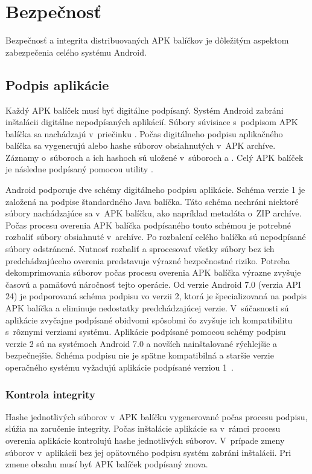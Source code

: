 \section{Bezpečnosť}

Bezpečnosť a integrita distribuovaných APK balíčkov je dôležitým aspektom zabezpečenia celého systému Android.

\subsection{Podpis aplikácie}

Každý APK balíček musí byť digitálne podpísaný. Systém Android zabráni inštalácii digitálne nepodpísaných aplikácií. 
Súbory súvisiace s~podpisom APK balíčka sa nachádzajú v~priečinku . Počas digitálneho podpisu aplikačného balíčka sa vygenerujú  alebo  hashe súborov obsiahnutých v~APK archíve. Záznamy o~súboroch a ich hashoch sú uložené v~súboroch  a . Celý APK balíček je následne podpísaný pomocou utility . 

Android podporuje dve schémy digitálneho podpisu aplikácie. Schéma verzie 1 je založená na podpise štandardného Java balíčka. Táto schéma nechráni niektoré súbory nachádzajúce sa v~APK balíčku, ako napríklad metadáta o~ZIP archíve. Počas procesu overenia APK balíčka podpísaného touto schémou je potrebné rozbaliť súbory obsiahnuté v~archíve. Po rozbalení celého balíčka sú nepodpísané súbory odstránené. Nutnosť rozbaliť a sprocesovať všetky súbory bez ich predchádzajúceho overenia predstavuje výrazné bezpečnostné riziko. Potreba dekomprimovania súborov počas procesu overenia APK balíčka výrazne zvyšuje časovú a pamäťovú náročnosť tejto operácie.  Od verzie Android 7.0 (verzia API 24) je podporovaná schéma podpisu vo verzii 2, ktorá je špecializovaná na podpis APK balíčka a eliminuje nedostatky predchádzajúcej verzie. V~súčasnosti sú aplikácie zvyčajne podpísané obidvomi spôsobmi čo zvyšuje ich kompatibilitu s~rôznymi verziami systému. Aplikácie podpísané pomocou schémy podpisu verzie 2 sú na systémoch Android 7.0 a novších nainštalované rýchlejšie a bezpečnejšie. Schéma podpisu nie je spätne kompatibilná a staršie verzie operačného systému vyžadujú aplikácie podpísané verziou 1~\cite{NT0FrzQIkOAYbG2Ga}.

\subsubsection{\textbf{Kontrola integrity}}
Hashe jednotlivých súborov v~APK balíčku vygenerované počas procesu podpisu, slúžia na zaručenie integrity. Počas inštalácie aplikácie sa v~rámci procesu overenia aplikácie kontrolujú hashe jednotlivých súborov. V~prípade zmeny súborov v~aplikácii bez jej opätovného podpisu systém zabráni inštalácii. Pri zmene obsahu musí byť APK balíček podpísaný znova. 


